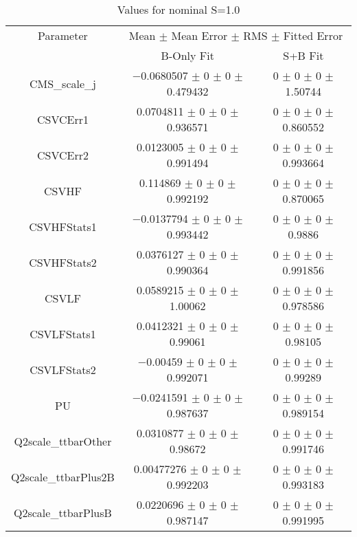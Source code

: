 \begin{table}
\centering
\caption{Values for nominal S=1.0}
\begin{tabular}{ccc}
\toprule
Parameter & \multicolumn{2}{c}{Mean $\pm$ Mean Error $\pm$ RMS $\pm$ Fitted Error}\\
 & B-Only Fit & S+B Fit\\
\midrule
CMS\_scale\_j & \num{-0.0680507} $\pm$ \num{0} $\pm$ \num{0} $\pm$ \num{0.479432} & \num{0} $\pm$ \num{0} $\pm$ \num{0} $\pm$ \num{1.50744}\\
CSVCErr1 & \num{0.0704811} $\pm$ \num{0} $\pm$ \num{0} $\pm$ \num{0.936571} & \num{0} $\pm$ \num{0} $\pm$ \num{0} $\pm$ \num{0.860552}\\
CSVCErr2 & \num{0.0123005} $\pm$ \num{0} $\pm$ \num{0} $\pm$ \num{0.991494} & \num{0} $\pm$ \num{0} $\pm$ \num{0} $\pm$ \num{0.993664}\\
CSVHF & \num{0.114869} $\pm$ \num{0} $\pm$ \num{0} $\pm$ \num{0.992192} & \num{0} $\pm$ \num{0} $\pm$ \num{0} $\pm$ \num{0.870065}\\
CSVHFStats1 & \num{-0.0137794} $\pm$ \num{0} $\pm$ \num{0} $\pm$ \num{0.993442} & \num{0} $\pm$ \num{0} $\pm$ \num{0} $\pm$ \num{0.9886}\\
CSVHFStats2 & \num{0.0376127} $\pm$ \num{0} $\pm$ \num{0} $\pm$ \num{0.990364} & \num{0} $\pm$ \num{0} $\pm$ \num{0} $\pm$ \num{0.991856}\\
CSVLF & \num{0.0589215} $\pm$ \num{0} $\pm$ \num{0} $\pm$ \num{1.00062} & \num{0} $\pm$ \num{0} $\pm$ \num{0} $\pm$ \num{0.978586}\\
CSVLFStats1 & \num{0.0412321} $\pm$ \num{0} $\pm$ \num{0} $\pm$ \num{0.99061} & \num{0} $\pm$ \num{0} $\pm$ \num{0} $\pm$ \num{0.98105}\\
CSVLFStats2 & \num{-0.00459} $\pm$ \num{0} $\pm$ \num{0} $\pm$ \num{0.992071} & \num{0} $\pm$ \num{0} $\pm$ \num{0} $\pm$ \num{0.99289}\\
PU & \num{-0.0241591} $\pm$ \num{0} $\pm$ \num{0} $\pm$ \num{0.987637} & \num{0} $\pm$ \num{0} $\pm$ \num{0} $\pm$ \num{0.989154}\\
Q2scale\_ttbarOther & \num{0.0310877} $\pm$ \num{0} $\pm$ \num{0} $\pm$ \num{0.98672} & \num{0} $\pm$ \num{0} $\pm$ \num{0} $\pm$ \num{0.991746}\\
Q2scale\_ttbarPlus2B & \num{0.00477276} $\pm$ \num{0} $\pm$ \num{0} $\pm$ \num{0.992203} & \num{0} $\pm$ \num{0} $\pm$ \num{0} $\pm$ \num{0.993183}\\
Q2scale\_ttbarPlusB & \num{0.0220696} $\pm$ \num{0} $\pm$ \num{0} $\pm$ \num{0.987147} & \num{0} $\pm$ \num{0} $\pm$ \num{0} $\pm$ \num{0.991995}\\

\end{tabular}
\end{table}

